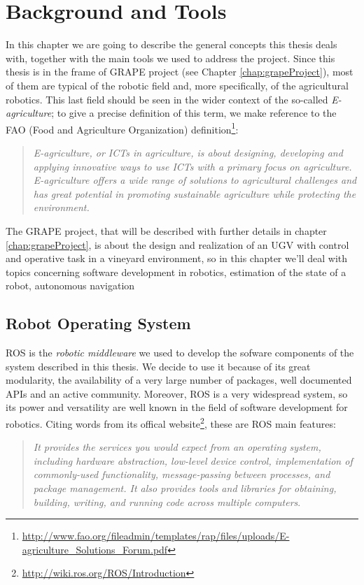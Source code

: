\chapter{Background and Tools} \label{chap:backgroundAndToolsChapter}

In this chapter we are going to describe the general concepts this thesis deals with, together with the main tools we used to address the project. Since this thesis is in the frame of \ac{GRAPE} project (see Chapter \ref{chap:grapeProject}),  most of them are typical of the robotic field and, more specifically, of the agricultural robotics. This last field should be seen in the wider context of the so-called \textit{E-agriculture}; to give a precise definition of this term, we make reference to the FAO (Food and Agriculture Organization) definition\footnote{\url{http://www.fao.org/fileadmin/templates/rap/files/uploads/E-agriculture\_Solutions\_Forum.pdf}}:
\blockquote{\textit{E-agriculture, or ICTs in agriculture, is about designing,
developing and applying innovative ways to use ICTs with a
primary focus on agriculture. E-agriculture offers a wide range
of solutions to agricultural challenges and has great potential
in promoting sustainable agriculture while protecting the
environment.}}
The \ac{GRAPE} project, that will be described with further details in chapter \ref{chap:grapeProject}, is about the design and realization of an \ac{UGV} with control and operative task in a vineyard environment, so in this chapter we'll deal with topics concerning software development in robotics, estimation of the state of a robot, autonomous navigation


\section{Robot Operating System}\label{sec:robotOperatingSystem}
\ac{ROS} is the \textit{robotic middleware} we used to develop the sofware components of the system described in this thesis. We decide to use it because of its great modularity, the availability of a very large number of packages, well documented APIs and an active community. Moreover, \ac{ROS} is a very widespread system, so its power and versatility are well known in the field of software development for robotics. Citing words from its offical website\footnote{\url{http://wiki.ros.org/ROS/Introduction}},
these are \ac{ROS} main features: 
\blockquote{
\textit{It provides the services you would expect from an operating system, including hardware abstraction, low-level device control, implementation of commonly-used functionality, message-passing between processes, and package management. It also provides tools and libraries for obtaining, building, writing, and running code across multiple computers}.
} 

